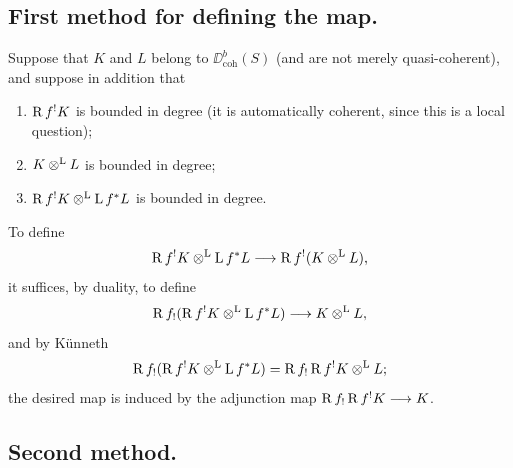 \subsection*{First method for defining the map.}

Suppose that $K$ and $L$ belong to $\DD_{\operatorname{coh}}^b(S)$ (and are not merely quasi-coherent), and suppose in addition that
\begin{enumerate}
\item[(a)] $\operatorname{R} f^!K$ is bounded in degree (it is automatically coherent, since this is a local question);
\item[(b)] $K\mathbin{\otimes^{\mathrm{L}}} L$ is bounded in degree;
\item[(c)] $\operatorname{R} f^!K\mathbin{\otimes^{\mathrm{L}}}\operatorname{L} f^*L$ is bounded in degree.
\end{enumerate}

To define
\[
\operatorname{R} f^{!}K \mathbin{\otimes^{\mathrm{L}}} \operatorname{L} f^{*}L
 \longrightarrow \operatorname{R} f^{!}(K \mathbin{\otimes^{\mathrm{L}}} L),
\]
it suffices, by duality, to define
\[
\operatorname{R} f_{!}(\operatorname{R} f^{!}K \mathbin{\otimes^{\mathrm{L}}} \operatorname{L} f^{*}L)
 \longrightarrow K \mathbin{\otimes^{\mathrm{L}}} L,
\]
and by K\"unneth
\[
\operatorname{R} f_{!}(\operatorname{R} f^{!}K \mathbin{\otimes^{\mathrm{L}}} \operatorname{L} f^{*}L)
 = \operatorname{R} f_{!}\operatorname{R} f^{!}K \mathbin{\otimes^{\mathrm{L}}} L;
\]
the desired map is induced by the adjunction map
$\operatorname{R} f_{!}\operatorname{R} f^{!}K \longrightarrow K$.

\subsection*{Second method.}

